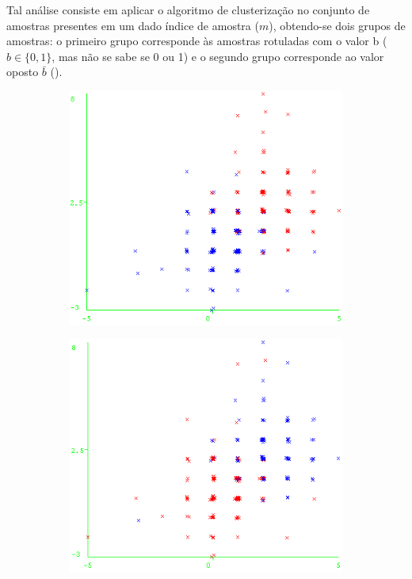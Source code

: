 Tal análise consiste em aplicar o algoritmo de clusterização no conjunto de amostras presentes em um dado índice de amostra ($m$), obtendo-se dois grupos de amostras: o primeiro grupo corresponde às amostras rotuladas com o valor b ($b\in \{0,1\}$, mas não se sabe se 0 ou 1) e o segundo grupo corresponde ao valor oposto $\bar{b}$ ().

\begin{figure}
	\centering
	\begin{subfigure}[b]{0.4\textwidth}
		\includegraphics[width=1\linewidth]{figures/Clustering_EM_2_POIs__clusters.png}
		\caption{}
		\label{fig:clusteringClusters}
	\end{subfigure}
	\hfill
	\begin{subfigure}[b]{0.4\textwidth}
		\includegraphics[width=1\linewidth]{figures/Clustering_EM_2_POIs__correct_labels.png}

\end{subfigure}
\end{figure}
